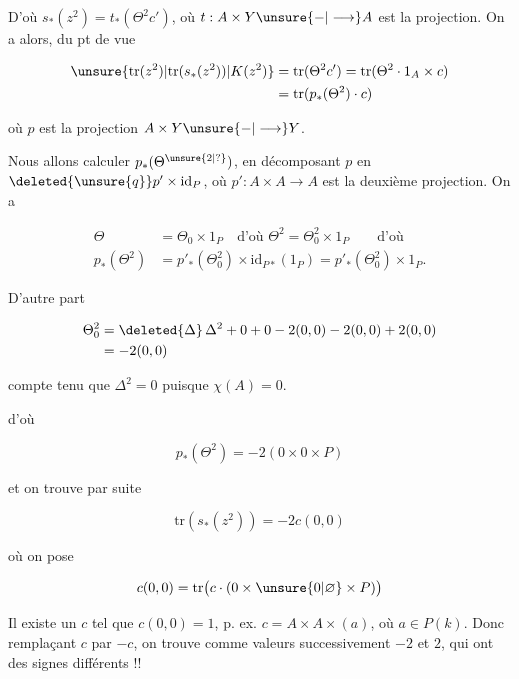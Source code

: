 D'où $s_*(z^2)=t_*(\Theta^2c')$, où $t:A\times Y\unsure{-|\longrightarrow}A$ est la projection. On a alors, du pt de vue 


\[
\begin{aligned}
\unsure{\mathrm{tr}(z^2)|\mathrm{tr}(s_*(z^2))|K(z^2)}&=\mathrm{tr}(\Theta^2c')=\mathrm{tr}(\Theta^2\cdot1_A\times c)\\
&=\mathrm{tr}(p_*(\Theta^2)\cdot c)
\end{aligned}
\]

où $p$ est la projection $A\times Y\unsure{-|\longrightarrow}Y$.

Nous allons calculer $p_*(\Theta^{\unsure{2|?}})$, en décomposant $p$ en $\deleted{\unsure{q}}p'\times\mathrm{id}_{P}$, où $p':A\times A\longrightarrow A$ est la deuxième projection. On a


\[
\begin{aligned}
\Theta&=\Theta_0\times1_P\quad\text{d'où }\Theta^2=\Theta_0^2\times1_P\qquad\text{d'où}\\
p_*(\Theta^2)&=p'_*(\Theta_0^2)\times\mathrm{id}_{P*}(1_P)=p'_*(\Theta_0^2)\times1_P.
\end{aligned}
\]

D'autre part

\[
\begin{aligned}
\Theta_0^2&=\deleted{\Delta}\,\Delta^2+0+0-2(0,0)-2(0,0)+2(0,0)\\
&=-2(0,0)
\end{aligned}
\]

compte tenu que $\Delta^2=0$  puisque $\chi(A)=0$.

d'où

\[
p_*(\Theta^2)=-2(0\times0\times P)
\]

et on trouve par suite

\[
\mathrm{tr}(s_*(z^2))=-2c(0,0)
\]

où on pose

\[
c(0,0)=\mathrm{tr}\bigl(c\cdot(0\times\unsure{0|\varnothing}\times P)\bigr)
\]

Il existe un $c$ tel que $c(0,0)=1$, p. ex. $c=A\times A\times(a)$, où $a\in P(k)$. Donc remplaçant  $c$ par $-c$, on trouve comme valeurs successivement $-2$ et $2$, qui ont des signes différents !!

